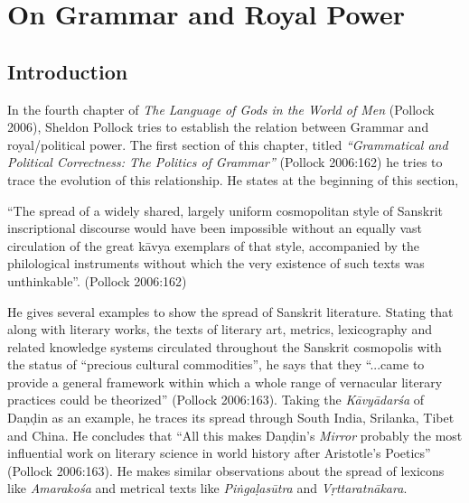 \chapter{On Grammar and Royal Power}\label{chapter3}


\section*{Introduction}

In the fourth chapter of {\sl The Language of Gods in the World of Men} (Pollock 2006), Sheldon Pollock tries to establish the relation between Grammar and royal/political power.  The first section of this chapter, titled {\sl ``Grammatical and Political Correctness: The Politics of Grammar''} (Pollock 2006:162) he tries to trace the evolution of this relationship. He states at the beginning of this section, 
\begin{myquote}
``The spread of a widely shared, largely uniform cosmopolitan style of Sanskrit inscriptional discourse would have been impossible without an equally vast circulation of the great kāvya exemplars of that style, accompanied by the philological instruments without which the very existence of such texts was unthinkable''.
\hfill (Pollock 2006:162) 
\end{myquote}

He gives several examples to show the spread of Sanskrit literature. Stating that along with literary works, the texts of literary art, metrics, lexicography and related knowledge systems circulated throughout the Sanskrit cosmopolis with the status of ``precious cultural commodities'', he says that they ``...came to provide a general framework within which a whole range of vernacular literary practices could be theorized'' (Pollock 2006:163). Taking the {\sl Kāvyādarśa} of Daṇḍin as an example, he traces its spread through South India, Srilanka, Tibet and China. He concludes that ``All this makes Daṇḍin's {\sl Mirror} probably the most influential work on literary science in world history after Aristotle's Poetics'' (Pollock 2006:163). He makes similar observations about the spread of lexicons like {\sl Amarakośa} and metrical texts like {\sl Piṅgaḷasūtra} and {\sl Vṛttaratnākara}. 


